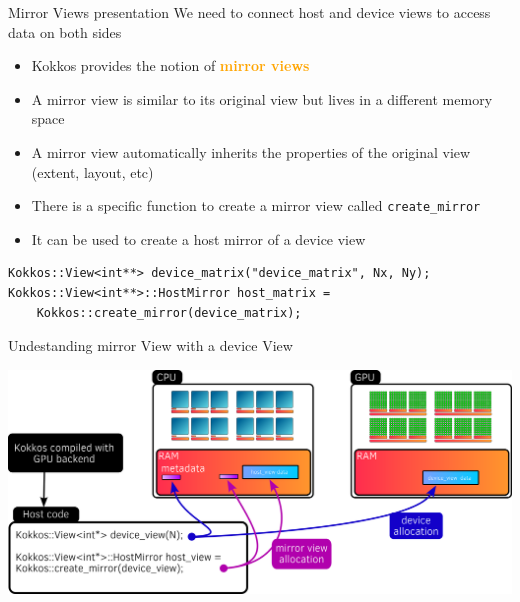 \documentclass[aspectratio=169]{beamer}
\newcommand{\highlight}[1]{\textcolor{orange}{\textbf{#1}}}
\begin{document}

\begin{frame}[fragile]{Mirror Views presentation}
     We need to connect host and device views to access data on both sides
    \begin{itemize}
        \item Kokkos provides the notion of \highlight{mirror views}
        \item A mirror view is similar to its original view but lives in a different memory space
        \item A mirror view automatically inherits the properties of the original view (extent, layout, etc)
        \item There is a specific function to create a mirror view called \texttt{create\_mirror}
        \item It can be used to create a host mirror of a device view
    \end{itemize}
    \begin{verbatim}
Kokkos::View<int**> device_matrix("device_matrix", Nx, Ny);
Kokkos::View<int**>::HostMirror host_matrix =
    Kokkos::create_mirror(device_matrix);
    \end{verbatim}
\end{frame}


\begin{frame}{Undestanding mirror View with a device View}
    \begin{center}
        \includegraphics[width=\textwidth]{device_mirror_view.png}
    \end{center}
\end{frame}

\end{document}
